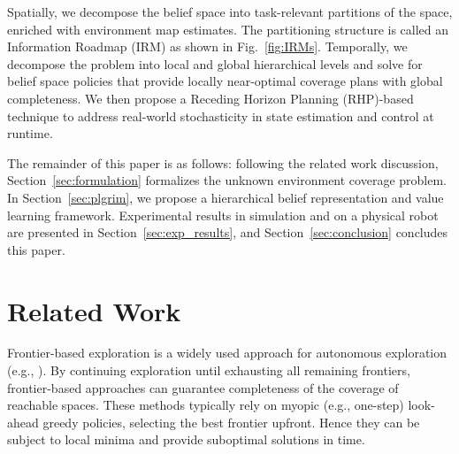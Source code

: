 \documentclass[letterpaper]{article} %
\newcommand{\phdone}[1]{} %
\newcommand{\acomm}[1]{{\color{cyan}Ali:#1}} %
\begin{document}
Spatially, we decompose the belief space into task-relevant partitions of the space,
enriched with environment map estimates. %
The partitioning structure is called an Information Roadmap (IRM) as shown in Fig.~\ref{fig:IRMs}.
Temporally, we decompose the problem into local and global hierarchical levels and solve for belief space policies that provide locally near-optimal coverage plans with global completeness.
We then propose a Receding Horizon Planning (RHP)-based technique to address real-world stochasticity in state estimation and control at runtime.

\phdone{Outline}
The remainder of this paper is as follows: following the related work discussion, Section~\ref{sec:formulation} formalizes the unknown environment coverage problem. In Section~\ref{sec:plgrim}, we propose a hierarchical belief representation and value learning framework. Experimental results in simulation and on a physical robot are presented in Section~\ref{sec:exp_results}, and Section~\ref{sec:conclusion} concludes this paper.


\section{Related Work}\label{sec:related_work}
\phdone{Coverage--Frontier-based exploration}
Frontier-based exploration is a widely used approach for autonomous exploration (e.g., \cite{yamauchi1997frontier,tao2007motion,keidar2012robot,heng2015efficient,gonzalez2002navigation,grabowski2003autonomous}). By continuing exploration until exhausting all remaining frontiers, frontier-based approaches can guarantee completeness of the coverage of reachable spaces.  These methods typically rely on myopic (e.g., one-step) look-ahead greedy policies, selecting the best frontier upfront. Hence they can be subject to local minima and provide suboptimal solutions in time.
\end{document}
